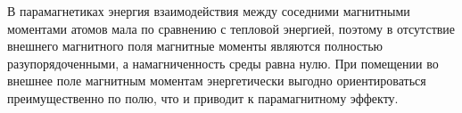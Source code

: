 В парамагнетиках энергия взаимодействия между соседними магнитными моментами
атомов мала по сравнению с тепловой энергией,
поэтому в отсутствие внешнего магнитного поля магнитные моменты
являются полностью разупорядоченными, а намагниченность среды равна нулю.
При помещении во внешнее поле магнитным моментам энергетически выгодно
ориентироваться преимущественно по полю, что и приводит к парамагнитному эффекту.

%



